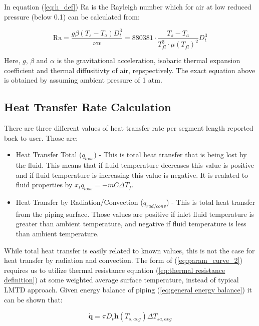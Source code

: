 \documentclass[10pt, letterpaper]{article}
\begin{document}
    In equation (\ref{eq:h_def}) $\text{Ra}$ is the Rayleigh number which for air at low reduced pressure (below 0.1) can be calculated from:

    \begin{equation}
        \text{Ra} = \frac{g \beta (T_{s} - T_{a}) D_{t}^{3}}{\nu \alpha} = 
		880381 \cdot \frac{T_{s} - T_{a}}{T_{fl}^{3} \cdot \mu(T_{fl})^{2}} D_{t}^{3}
		\label{eq:rayleigh}
    \end{equation}

	Here, $g$, $\beta$ and $\alpha$ is the gravitational acceleration, isobaric thermal expansion coefficient and thermal diffusitivty of air, repspectively. The exact equation above is obtained by assuming ambient pressure of 1 atm.

	\subsection{Heat Transfer Rate Calculation}
	There are three different values of heat transfer rate per segment length reported back to user. Those are:

	\begin{itemize}
		\item Heat Transfer Total ($\dot{q}_{loss}$) - This is total heat transfer that is being lost by the fluid. This means that if fluid temperature decreases this value is positive and if fluid temperature is increasing this value is negative. It is realated to fluid properties by $x_{t} \dot{q}_{loss} = -\dot{m} C \Delta{T_{f}}$.
		\item Heat Transfer by Radiation/Convection ($\dot{q}_{rad/conv}$) - This is total heat transfer from the piping surface. Those values are positive if inlet fluid temperature is greater than ambient temperature, and negative if fluid temperature is less than ambient temperature.
	\end{itemize}

	While total heat transfer is easily related to known values, this is not the case for heat transfer by radiation and convection. The form of (\ref{eq:param_curve_2}) requires us to utilize thermal resistance equation (\ref{eq:thermal resistance definition}) at some weighted average surface temperature, instead of typical LMTD approach. Given energy balance of piping (\ref{eq:general energy balance}) it can be shown that:

	\begin{equation}
		\mathbf{\dot{q}} = \pi D_{t} \mathbf{h}(T_{s, avg}) \Delta{T_{sa, avg}}
	\end{equation}
\end{document}
